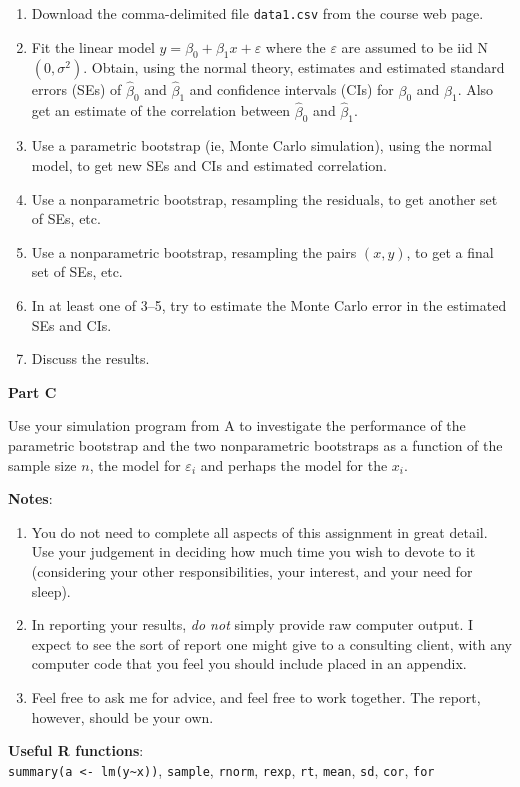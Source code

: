 \documentclass[]{article}
\begin{document}
\begin{enumerate}

\item Download the comma-delimited file \verb|data1.csv| from the
  course web page. 

\item Fit the linear model $y = \beta_0 + \beta_1 x + \varepsilon$
  where the $\varepsilon$ are assumed to be iid N$(0, \sigma^2)$.
  Obtain, using the normal theory, estimates and estimated standard
  errors (SEs) of $\hat{\beta}_0$ and $\hat{\beta}_1$ and confidence
  intervals (CIs) for $\beta_0$ and $\beta_1$.  Also get an estimate
  of the correlation between $\hat{\beta}_0$ and $\hat{\beta}_1$.  

\item Use a parametric bootstrap (ie, Monte Carlo simulation), using
  the normal model, to get new SEs and CIs and estimated correlation.

\item Use a nonparametric bootstrap, resampling the residuals, to get
  another set of SEs, etc.

\item Use a nonparametric bootstrap, resampling the pairs $(x,y)$, to
  get a final set of SEs, etc.

\item In at least one of 3--5, try to estimate the Monte Carlo error
  in the estimated SEs and CIs.

\item Discuss the results.  

\end{enumerate}

\bigskip

\textbf{Part C}

Use your simulation program from A to investigate the performance of
the parametric bootstrap and the two nonparametric bootstraps as a
function of the sample size $n$, the model for $\varepsilon_i$ and
perhaps the model for the $x_i$.

\bigskip

\textbf{Notes}: 
\begin{enumerate}
\item You do not need to complete all aspects of this assignment in
  great detail.  Use your judgement in deciding how much time you wish
  to devote to it (considering your other responsibilities, your
  interest, and your need for sleep).
\item In reporting your results, \emph{do not\/} simply provide raw
  computer output.  I expect to see the sort of report one might give
  to a consulting client, with any computer code that you feel you
  should include placed in an appendix.
\item Feel free to ask me for advice, and feel free to work together.
  The report, however, should be your own.
\end{enumerate}

\bigskip

\textbf{Useful R functions}: \\
\verb|summary(a <- lm(y~x))|, \verb|sample|, \verb|rnorm|,
\verb|rexp|, \verb|rt|, \verb|mean|, \verb|sd|, \verb|cor|, \verb|for|
\end{document}
